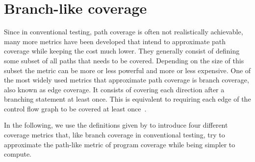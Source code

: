 \section{Branch-like coverage}
\label{sec:Coverage metrics/Branch-like coverage}
Since in conventional testing, path coverage is often not realistically achievable, many more metrics have been developed that intend to approximate path coverage while keeping the cost much lower. They generally consist of defining some subset of all paths that needs to be covered. Depending on the size of this subset the metric can be more or less powerful and more or less expensive. One of the most widely used metrics that approximate path coverage is branch coverage, also known as edge coverage. It consists of covering each direction after a branching statement at least once. This is equivalent to requiring each edge of the control flow graph to be covered at least once~\cite[Chapter 7.2]{AO16}.

In the following, we use the definitions given by \textcite{Jan+10} to introduce four different coverage metrics that, like branch coverage in conventional testing, try to approximate the path-like metric of program coverage while being simpler to compute.


